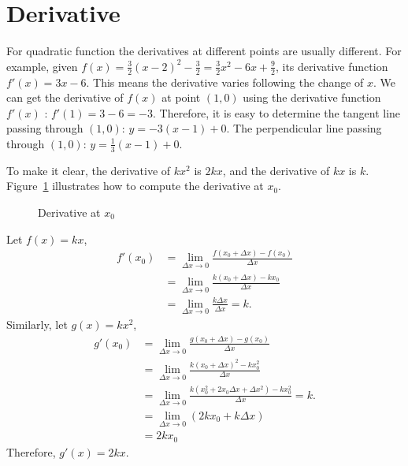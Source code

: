 \documentclass[11pt, oneside]{article}   	%
\begin{document}
\newpage
\section{Derivative}
For quadratic function the derivatives at different points are usually different. For example, given $f(x)=\frac{3}{2}(x-2)^2-\frac{3}{2}=\frac{3}{2}x^2-6x+\frac{9}{2}$, its derivative function $f'(x)=3x-6$. This means the derivative varies following the change of $x$. We can get the derivative of $f(x)$ at point $(1,0)$ using the derivative function $f'(x)$ : $f'(1)=3-6=-3$. Therefore, it is easy to determine the tangent line passing through $(1,0)$: $y=-3(x-1)+0$. The perpendicular line passing through $(1,0)$: $y=\frac{1}{3}(x-1)+0$. 

To make it clear, the derivative of $kx^2$ is $2kx$, and the derivative of $kx$ is $k$.  Figure~\ref{fig:derivative} illustrates how to compute the derivative at $x_0$.
\begin{figure}
\centering
{}
\caption{Derivative at $x_0$}
\label{fig:derivative}
\end{figure}


Let $f(x)=kx$, 
\begin{align*}
f'(x_0) &=\lim_{\Delta x \rightarrow 0} \frac{f(x_0+\Delta x) - f(x_0)}{\Delta x}\\
&=\lim_{\Delta x \rightarrow 0} \frac{k(x_0+\Delta x) - kx_0}{\Delta x}\\
&=\lim_{\Delta x \rightarrow 0} \frac{k \Delta x}{\Delta x}=k.
\end{align*}
Similarly, let $g(x) = kx^2$,
\begin{align*}
g'(x_0) &=\lim_{\Delta x \rightarrow 0} \frac{g(x_0+\Delta x) - g(x_0)}{\Delta x}\\
&=\lim_{\Delta x \rightarrow 0} \frac{k(x_0+\Delta x)^2 - kx_0^2}{\Delta x}\\
&=\lim_{\Delta x \rightarrow 0} \frac{k(x_0^2+2x_0 \Delta x + \Delta x^2)-kx_0^2}{\Delta x}=k.\\
&=\lim_{\Delta x \rightarrow 0} (2k x_0+k \Delta x)\\
&=2kx_0
\end{align*}
Therefore, $g'(x)=2kx$.
\end{document}
